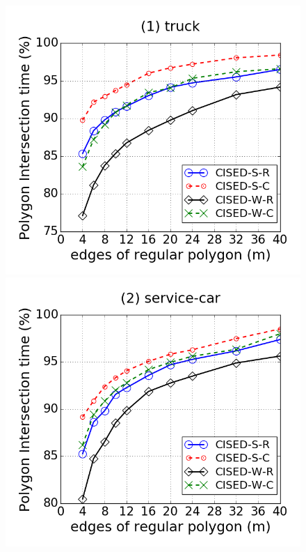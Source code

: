 \begin{figure}[tb!]
\centering
\includegraphics[scale = 0.240]{figures/Exp-M-poly-time-ratio-truck.png}
\includegraphics[scale = 0.240]{figures/Exp-M-poly-time-ratio-service.png}

\end{figure}
